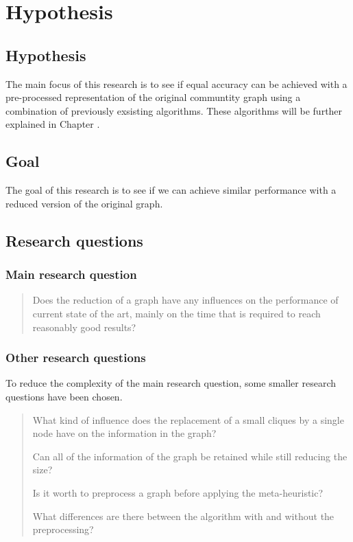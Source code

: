 \section{Hypothesis}
\label{chapter:hypothesis}

\subsection{Hypothesis}
The main focus of this research is to see if equal accuracy can be achieved with a pre-processed representation of the original communtity graph using a combination of previously exsisting algorithms.
These algorithms will be further explained in Chapter \cite{chapter:relevantResearch}.


\subsection{Goal}
The goal of this research is to see if we can achieve similar performance with a reduced version of the original graph.


\subsection{Research questions}
\subsubsection{Main research question}
\begin{quote}
Does the reduction of a graph have any influences on the performance of current state of the art, mainly on the time that is required to reach reasonably good results?
\end{quote}
\subsubsection{Other research questions}
To reduce the complexity of the main research question, some smaller research questions have been chosen.
\begin{quote}
What kind of influence does the replacement of a small cliques by a single node have on the information in the graph?

Can all of the information of the graph be retained while still reducing the size?

Is it worth to preprocess a graph before applying the meta-heuristic?

What differences are there between the algorithm with and without the preprocessing?
\end{quote}
